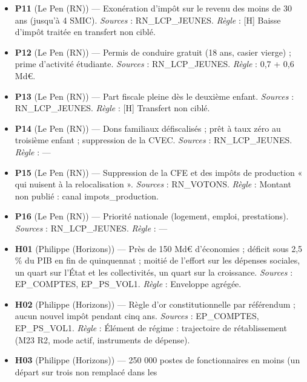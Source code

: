 \documentclass[
  11pt,
  11pt,
  a4paper,
  openany]{book}
\begin{document}
\begin{itemize}
  l'électricité, le gaz, le fioul et les carburants. \emph{Sources} :
  RN\_ENERGIE, MONTAIGNE\_TVA\_2022. \emph{Règle} : Coût : ordre de
  grandeur de l'Institut Montaigne (2022), aucun montant du candidat
  dans les sources. {[}H{]} Baisse équivalente du taux normal (le modèle
  ne distingue pas l'énergie) : la répercussion sur les prix est
  répartie sur toute la consommation.
\item
  \textbf{P11} (Le Pen (RN)) --- Exonération d'impôt sur le revenu des
  moins de 30 ans (jusqu'à 4 SMIC). \emph{Sources} : RN\_LCP\_JEUNES.
  \emph{Règle} : {[}H{]} Baisse d'impôt traitée en transfert non ciblé.
\item
  \textbf{P12} (Le Pen (RN)) --- Permis de conduire gratuit (18 ans,
  casier vierge) ; prime d'activité étudiante. \emph{Sources} :
  RN\_LCP\_JEUNES. \emph{Règle} : 0,7 + 0,6 Md€.
\item
  \textbf{P13} (Le Pen (RN)) --- Part fiscale pleine dès le deuxième
  enfant. \emph{Sources} : RN\_LCP\_JEUNES. \emph{Règle} : {[}H{]}
  Transfert non ciblé.
\item
  \textbf{P14} (Le Pen (RN)) --- Dons familiaux défiscalisés ; prêt à
  taux zéro au troisième enfant ; suppression de la CVEC. \emph{Sources}
  : RN\_LCP\_JEUNES. \emph{Règle} : ---
\item
  \textbf{P15} (Le Pen (RN)) --- Suppression de la CFE et des impôts de
  production « qui nuisent à la relocalisation ». \emph{Sources} :
  RN\_VOTONS. \emph{Règle} : Montant non publié : canal
  impots\_production.
\item
  \textbf{P16} (Le Pen (RN)) --- Priorité nationale (logement, emploi,
  prestations). \emph{Sources} : RN\_LCP\_JEUNES. \emph{Règle} : ---
\item
  \textbf{H01} (Philippe (Horizons)) --- Près de 150 Md€ d'économies ;
  déficit sous 2,5 \% du PIB en fin de quinquennat ; moitié de l'effort
  sur les dépenses sociales, un quart sur l'État et les collectivités,
  un quart sur la croissance. \emph{Sources} : EP\_COMPTES,
  EP\_PS\_VOL1. \emph{Règle} : Enveloppe agrégée.
\item
  \textbf{H02} (Philippe (Horizons)) --- Règle d'or constitutionnelle
  par référendum ; aucun nouvel impôt pendant cinq ans. \emph{Sources} :
  EP\_COMPTES, EP\_PS\_VOL1. \emph{Règle} : Élément de régime :
  trajectoire de rétablissement (M23 R2, mode actif, instruments de
  dépense).
\item
  \textbf{H03} (Philippe (Horizons)) --- 250 000 postes de
  fonctionnaires en moins (un départ sur trois non remplacé dans les

\end{itemize}
\end{document}

